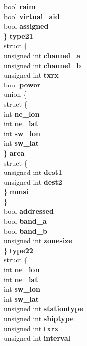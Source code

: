 \begin{DoxyCompactItemize}
{\begin{tabbing}
\>\>bool {\bfseries raim}\\
\>\>bool {\bfseries virtual\_aid}\\
\>\>bool {\bfseries assigned}\\
\>\} {\bfseries type21}\\
\>struct \{\\
\>\>unsigned int {\bfseries channel\_a}\\
\>\>unsigned int {\bfseries channel\_b}\\
\>\>unsigned int {\bfseries txrx}\\
\>\>bool {\bfseries power}\\
\hypertarget{structais__t_1_1@34_1_1@53_ad503cc232d98fa63e28b71babf4d45b2}{\>\>union \{\\
\>\>\>struct \{\\
\>\>\>\>int {\bfseries ne\_lon}\\
\>\>\>\>int {\bfseries ne\_lat}\\
\>\>\>\>int {\bfseries sw\_lon}\\
\>\>\>\>int {\bfseries sw\_lat}\\
\>\>\>\} {\bfseries area}\\
\>\>\>struct \{\\
\>\>\>\>unsigned int {\bfseries dest1}\\
\>\>\>\>unsigned int {\bfseries dest2}\\
\>\>\>\} {\bfseries mmsi}\\
\>\>\} }\label{structais__t_1_1@34_1_1@53_ad503cc232d98fa63e28b71babf4d45b2}
\\
\>\>bool {\bfseries addressed}\\
\>\>bool {\bfseries band\_a}\\
\>\>bool {\bfseries band\_b}\\
\>\>unsigned int {\bfseries zonesize}\\
\>\} {\bfseries type22}\\
\>struct \{\\
\>\>int {\bfseries ne\_lon}\\
\>\>int {\bfseries ne\_lat}\\
\>\>int {\bfseries sw\_lon}\\
\>\>int {\bfseries sw\_lat}\\
\>\>unsigned int {\bfseries stationtype}\\
\>\>unsigned int {\bfseries shiptype}\\
\>\>unsigned int {\bfseries txrx}\\
\>\>unsigned int {\bfseries interval}\\

\end{tabbing}}
\end{DoxyCompactItemize}
